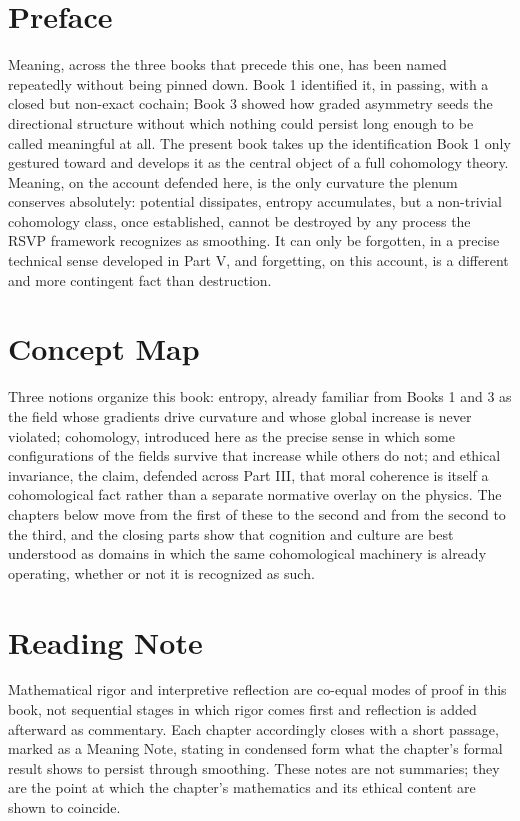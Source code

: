 \chapter*{Preface}

Meaning, across the three books that precede this one, has been named repeatedly without being pinned down. Book 1 identified it, in passing, with a closed but non-exact cochain; Book 3 showed how graded asymmetry seeds the directional structure without which nothing could persist long enough to be called meaningful at all. The present book takes up the identification Book 1 only gestured toward and develops it as the central object of a full cohomology theory. Meaning, on the account defended here, is the only curvature the plenum conserves absolutely: potential dissipates, entropy accumulates, but a non-trivial cohomology class, once established, cannot be destroyed by any process the RSVP framework recognizes as smoothing. It can only be forgotten, in a precise technical sense developed in Part V, and forgetting, on this account, is a different and more contingent fact than destruction.

\chapter*{Concept Map}

Three notions organize this book: entropy, already familiar from Books 1 and 3 as the field whose gradients drive curvature and whose global increase is never violated; cohomology, introduced here as the precise sense in which some configurations of the fields survive that increase while others do not; and ethical invariance, the claim, defended across Part III, that moral coherence is itself a cohomological fact rather than a separate normative overlay on the physics. The chapters below move from the first of these to the second and from the second to the third, and the closing parts show that cognition and culture are best understood as domains in which the same cohomological machinery is already operating, whether or not it is recognized as such.

\chapter*{Reading Note}

Mathematical rigor and interpretive reflection are co-equal modes of proof in this book, not sequential stages in which rigor comes first and reflection is added afterward as commentary. Each chapter accordingly closes with a short passage, marked as a Meaning Note, stating in condensed form what the chapter's formal result shows to persist through smoothing. These notes are not summaries; they are the point at which the chapter's mathematics and its ethical content are shown to coincide.

